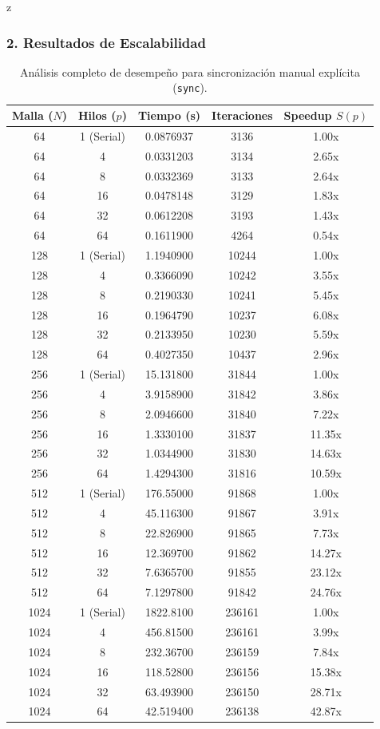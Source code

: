 z\documentclass[11pt,a4paper]{article}
\begin{document}
\subsubsection*{2. Resultados de Escalabilidad}
\begin{table}[H]
\centering
\renewcommand{\arraystretch}{1.2}
\small
\begin{tabular}{|c|c|c|c|c|}
\hline
\textbf{Malla ($N$)} & \textbf{Hilos ($p$)} & \textbf{Tiempo (s)} & \textbf{Iteraciones} & \textbf{Speedup $S(p)$} \\ \hline
64 & 1 (Serial) & 0.0876937 & 3136 & 1.00x \\ 
64 & 4 & 0.0331203 & 3134 & 2.65x \\ 
64 & 8 & 0.0332369 & 3133 & 2.64x \\ 
64 & 16 & 0.0478148 & 3129 & 1.83x \\ 
64 & 32 & 0.0612208 & 3193 & 1.43x \\ 
64 & 64 & 0.1611900 & 4264 & 0.54x \\ \hline
128 & 1 (Serial) & 1.1940900 & 10244 & 1.00x \\ 
128 & 4 & 0.3366090 & 10242 & 3.55x \\ 
128 & 8 & 0.2190330 & 10241 & 5.45x \\ 
128 & 16 & 0.1964790 & 10237 & 6.08x \\ 
128 & 32 & 0.2133950 & 10230 & 5.59x \\ 
128 & 64 & 0.4027350 & 10437 & 2.96x \\ \hline
256 & 1 (Serial) & 15.131800 & 31844 & 1.00x \\ 
256 & 4 & 3.9158900 & 31842 & 3.86x \\ 
256 & 8 & 2.0946600 & 31840 & 7.22x \\ 
256 & 16 & 1.3330100 & 31837 & 11.35x \\ 
256 & 32 & 1.0344900 & 31830 & 14.63x \\ 
256 & 64 & 1.4294300 & 31816 & 10.59x \\ \hline
512 & 1 (Serial) & 176.55000 & 91868 & 1.00x \\ 
512 & 4 & 45.116300 & 91867 & 3.91x \\ 
512 & 8 & 22.826900 & 91865 & 7.73x \\ 
512 & 16 & 12.369700 & 91862 & 14.27x \\ 
512 & 32 & 7.6365700 & 91855 & 23.12x \\ 
512 & 64 & 7.1297800 & 91842 & 24.76x \\ \hline
1024 & 1 (Serial) & 1822.8100 & 236161 & 1.00x \\ 
1024 & 4 & 456.81500 & 236161 & 3.99x \\ 
1024 & 8 & 232.36700 & 236159 & 7.84x \\ 
1024 & 16 & 118.52800 & 236156 & 15.38x \\ 
1024 & 32 & 63.493900 & 236150 & 28.71x \\ 
1024 & 64 & 42.519400 & 236138 & 42.87x \\ \hline
\end{tabular}
\caption{Análisis completo de desempeño para sincronización manual explícita (\texttt{sync}).}
\label{tab:resultados_sync_total}
\end{table}
\end{document}

